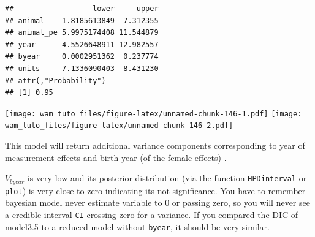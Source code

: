 \documentclass[
  12pt,
]{book}
\newenvironment{Shaded}{\begin{snugshade}}{\end{snugshade}}
\newcommand{\FloatTok}[1]{\textcolor[rgb]{0.00,0.00,0.81}{#1}}
\newcommand{\KeywordTok}[1]{\textcolor[rgb]{0.13,0.29,0.53}{\textbf{#1}}}
\newcommand{\NormalTok}[1]{#1}
\newcommand{\OperatorTok}[1]{\textcolor[rgb]{0.81,0.36,0.00}{\textbf{#1}}}
\begin{document}
\begin{verbatim}
##                  lower     upper
## animal    1.8185613849  7.312355
## animal_pe 5.9975174408 11.544879
## year      4.5526648911 12.982557
## byear     0.0002951362  0.237774
## units     7.1336090403  8.431230
## attr(,"Probability")
## [1] 0.95
\end{verbatim}

\begin{Shaded}
\end{Shaded}

\texttt{[image: wam\_tuto\_files/figure-latex/unnamed-chunk-146-1.pdf]} \texttt{[image: wam\_tuto\_files/figure-latex/unnamed-chunk-146-2.pdf]}

This model will return additional variance components corresponding to year of measurement effects and birth year (of the female effects) .

\(V_{byear}\) is very low and its posterior distribution (via the function \texttt{HPDinterval} or \texttt{plot}) is very close to zero indicating its not significance. You have to remember bayesian model never estimate variable to 0 or passing zero, so you will never see a credible interval \texttt{CI} crossing zero for a variance.
If you compared the DIC of model3.5 to a reduced model without \texttt{byear}, it should be very similar.
\end{document}

